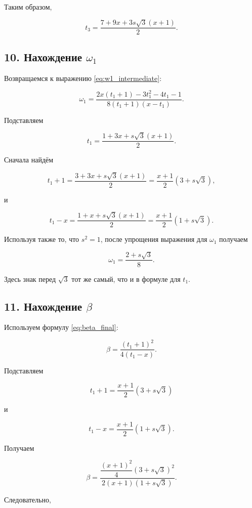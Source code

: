\documentclass[a4paper,12pt]{article}
\begin{document}
	Таким образом,
	
	\begin{equation}
		\boxed{
			t_3
			=
			\frac{
				7+9x+3s\sqrt3(x+1)
			}{2}.
		}
		\label{eq:t3_final}
	\end{equation}
	
	\subsection*{10. Нахождение $\omega_1$}
	
	Возвращаемся к выражению \eqref{eq:w1_intermediate}:
	
	\[
	\omega_1
	=
	\frac{
		2x(t_1+1)-3t_1^2-4t_1-1
	}{
		8(t_1+1)(x-t_1)
	}.
	\]
	
	Подставляем
	
	\[
	t_1=
	\frac{1+3x+s\sqrt3(x+1)}2.
	\]
	
	Сначала найдём
	
	\[
	t_1+1
	=
	\frac{
		3+3x+s\sqrt3(x+1)
	}{2}
	=
	\frac{x+1}{2}(3+s\sqrt3),
	\]
	
	и
	
	\[
	t_1-x
	=
	\frac{
		1+x+s\sqrt3(x+1)
	}{2}
	=
	\frac{x+1}{2}(1+s\sqrt3).
	\]
	
	Используя также то, что $s^2=1$, после упрощения выражения для $\omega_1$ получаем
	
	\begin{equation}
		\boxed{
			\omega_1
			=
			\frac{2+s\sqrt3}{8}.
		}
		\label{eq:w1_final}
	\end{equation}
	
	Здесь знак перед $\sqrt3$ тот же самый, что и в формуле для $t_1$.
	
	\subsection*{11. Нахождение $\beta$}
	
	Используем формулу \eqref{eq:beta_final}:
	
	\[
	\beta
	=
	\frac{(t_1+1)^2}{4(t_1-x)}.
	\]
	
	Подставляем
	
	\[
	t_1+1
	=
	\frac{x+1}{2}(3+s\sqrt3)
	\]
	
	и
	
	\[
	t_1-x
	=
	\frac{x+1}{2}(1+s\sqrt3).
	\]
	
	Получаем
	
	\[
	\beta
	=
	\frac{
		\dfrac{(x+1)^2}{4}(3+s\sqrt3)^2
	}{
		2(x+1)(1+s\sqrt3)
	}.
	\]
	
	Следовательно,
	
\end{document}
